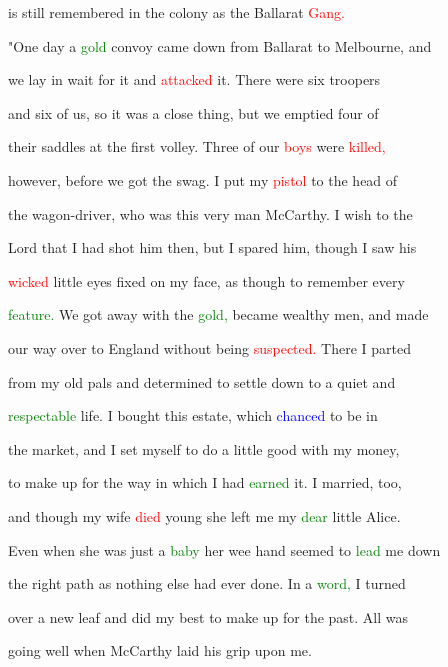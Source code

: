  is still remembered in the colony as the Ballarat \textcolor{red}{Gang.}



 "One day a \textcolor{green}{gold} convoy came down from Ballarat to Melbourne, and

 we lay in \textcolor{BurntOrange}{wait} for it and \textcolor{red}{attacked} it. There were six troopers

 and six of us, so it was a close thing, but we emptied four of

 their saddles at the first volley. Three of our \textcolor{red}{boys} were \textcolor{red}{killed,}

 however, before we got the swag. I put my \textcolor{red}{pistol} to the head of

 the wagon-driver, who was this very man McCarthy. I wish to the

 \textcolor{BurntOrange}{Lord} that I had \textcolor{BurntOrange}{shot} him then, but I spared him, though I saw his

 \textcolor{red}{wicked} little eyes fixed on my face, as though to remember every

 \textcolor{green}{feature.} We got away with the \textcolor{green}{gold,} became wealthy men, and made

 our way over to England without being \textcolor{red}{suspected.} There I parted

 from my old pals and determined to settle down to a \textcolor{BurntOrange}{quiet} and

 \textcolor{green}{respectable} life. I bought this estate, which \textcolor{blue}{chanced} to be in

 the market, and I set myself to do a little \textcolor{BurntOrange}{good} with my \textcolor{BurntOrange}{money,}

 to make up for the way in which I had \textcolor{green}{earned} it. I married, too,

 and though my wife \textcolor{red}{died} \textcolor{BurntOrange}{young} she left me my \textcolor{green}{dear} little Alice.

 Even when she was just a \textcolor{green}{baby} her wee hand seemed to \textcolor{green}{lead} me down

 the right path as nothing else had ever done. In a \textcolor{green}{word,} I turned

 over a new leaf and did my best to make up for the past. All was

 going well when McCarthy laid his grip upon me.



